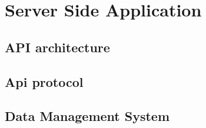 \section{Server Side Application}
\label{sec:ssa_implementation}



\subsection{API architecture}
\label{sec:api_architecture}


\subsection{Api protocol}
\label{sec:api_protocol}


\subsection{Data Management System}
\label{sec:dms_implementation}
